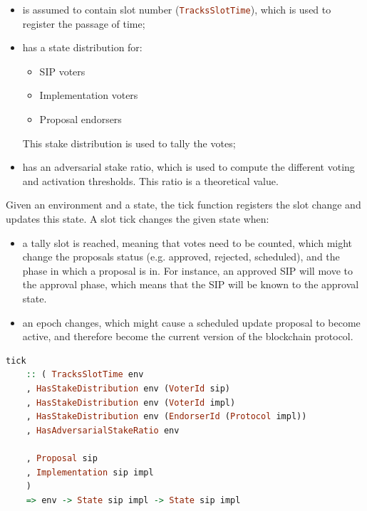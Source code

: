 \begin{itemize}
	\item is assumed to contain slot number 
	(\lstinline[language=Haskell]!TracksSlotTime!), which is
	used to register the passage of time;
	\item has a state distribution for:
	\begin{itemize}
		\item SIP voters
		\item Implementation voters
		\item Proposal endorsers
	\end{itemize}
	This stake distribution is used to tally the votes;
	\item has an adversarial stake ratio, which is used to compute the different
	voting and activation thresholds. This ratio is a theoretical value.
\end{itemize}

Given an environment and a state, the tick function registers the slot change
and updates this state. A slot tick changes the given state when:
\begin{itemize}
	\item a tally slot is reached, meaning that votes need to be counted, which
	might change the proposals status (e.g. approved, rejected, scheduled), and
	the phase in which a proposal is in. For instance, an approved SIP will move
	to the approval phase, which means that the SIP will be known to the 
	approval
	state.
	\item an epoch changes, which might cause a scheduled update proposal to 
	become
	active, and therefore become the current version of the blockchain protocol.
\end{itemize}

\begin{lstlisting}[language=Haskell]
	tick
	:: ( TracksSlotTime env
	, HasStakeDistribution env (VoterId sip)
	, HasStakeDistribution env (VoterId impl)
	, HasStakeDistribution env (EndorserId (Protocol impl))
	, HasAdversarialStakeRatio env
	
	, Proposal sip
	, Implementation sip impl
	)
	=> env -> State sip impl -> State sip impl
\end{lstlisting}


